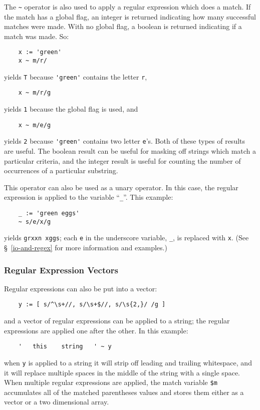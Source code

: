 The \verb+~+ operator is also used to apply a regular expression which does
a match. If the match has a global flag, an integer is returned indicating
how many successful matches were made. With no global flag, a boolean is
returned indicating if a match was made. So:
\begin{verbatim}
    x := 'green'
    x ~ m/r/ 
\end{verbatim}
yields {\tt T} because \verb+'green'+ contains the letter \verb+r+,
\begin{verbatim}
    x ~ m/r/g
\end{verbatim}
yields {\tt 1} because the global flag is used, and
\begin{verbatim}
    x ~ m/e/g
\end{verbatim}
yields {\tt 2} because \verb+'green'+ contains two letter \verb+e+'s.
Both of these types of results are useful. The boolean result can be
useful for masking off strings which match a particular criteria, and
the integer result is useful for counting the number of occurrences of
a particular substring.

This operator can also be used as a unary operator. In this case, the
regular expression is applied to the variable ``{\tt \_}''. This example:
\begin{verbatim}
    _ := 'green eggs'
    ~ s/e/x/g
\end{verbatim}
yields \verb+grxxn xggs+; each \verb+e+ in the underscore variable,
\verb+_+, is replaced with \verb+x+. (See \S~\ref{io-and-regex} for more
information and examples.)

\subsubsection{Regular Expression Vectors}
Regular expressions can also be put into a vector:
\begin{verbatim}
    y := [ s/^\s+//, s/\s+$//, s/\s{2,}/ /g ]
\end{verbatim}
and a vector of regular expressions can be applied to a string; the
regular expressions are applied one after the other. In this example:
\begin{verbatim}
    '   this    string   ' ~ y
\end{verbatim}
when {\tt y} is applied to a string it will strip off leading and
trailing whitespace, and it will replace multiple spaces in the middle of
the string with a single space. When multiple regular expressions are
applied, the match variable \verb+$m+ accumulates all of the matched
parentheses values and stores them either as a vector or a two dimensional
array.

